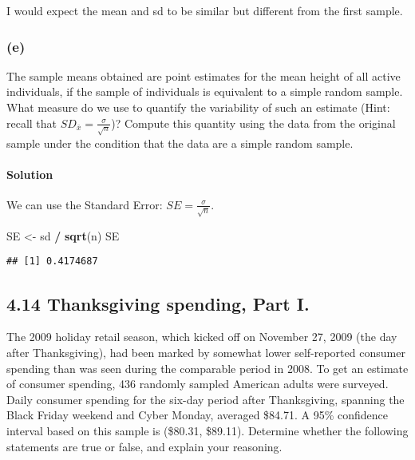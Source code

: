\documentclass[]{article}
\newenvironment{Shaded}{\begin{snugshade}}{\end{snugshade}}
\newcommand{\KeywordTok}[1]{\textcolor[rgb]{0.13,0.29,0.53}{\textbf{#1}}}
\newcommand{\StringTok}[1]{\textcolor[rgb]{0.31,0.60,0.02}{#1}}
\newcommand{\OperatorTok}[1]{\textcolor[rgb]{0.81,0.36,0.00}{\textbf{#1}}}
\newcommand{\NormalTok}[1]{#1}
\let\oldparagraph\paragraph
\renewcommand{\paragraph}[1]{\oldparagraph{#1}\mbox{}}
\begin{document}
I would expect the mean and sd to be similar but different from the
first sample.

\subsubsection{(e)}\label{e}

The sample means obtained are point estimates for the mean height of all
active individuals, if the sample of individuals is equivalent to a
simple random sample. What measure do we use to quantify the variability
of such an estimate (Hint: recall that
\(SD_\bar x = \frac{\sigma}{\sqrt{n}}\))? Compute this quantity using
the data from the original sample under the condition that the data are
a simple random sample.

\paragraph{Solution}\label{solution-4}

We can use the Standard Error: \(SE = \frac{\sigma}{\sqrt{n}}\).

\begin{Shaded}
\begin{Highlighting}[]
\NormalTok{SE <-}\StringTok{ }\NormalTok{sd }\OperatorTok{/}\StringTok{ }\KeywordTok{sqrt}\NormalTok{(n)}
\NormalTok{SE}
\end{Highlighting}
\end{Shaded}

\begin{verbatim}
## [1] 0.4174687
\end{verbatim}

\subsection{4.14 Thanksgiving spending, Part
I.}\label{thanksgiving-spending-part-i.}

The 2009 holiday retail season, which kicked off on November 27, 2009
(the day after Thanksgiving), had been marked by somewhat lower
self-reported consumer spending than was seen during the comparable
period in 2008. To get an estimate of consumer spending, 436 randomly
sampled American adults were surveyed. Daily consumer spending for the
six-day period after Thanksgiving, spanning the Black Friday weekend and
Cyber Monday, averaged \$84.71. A 95\% confidence interval based on this
sample is (\$80.31, \$89.11). Determine whether the following statements
are true or false, and explain your reasoning.
\end{document}
